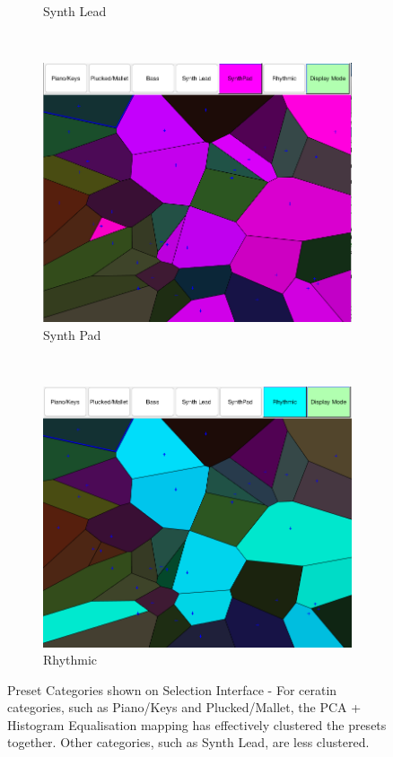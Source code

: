 \documentclass[11pt, oneside]{report}   	%
\begin{document}
\begin{figure}
\begin{subfigure}[b]{0.48\textwidth}
	\caption{Synth Lead}
	\label{fig:categoriesSynthLead}
\end{subfigure}
\\
\begin{subfigure}[b]{0.48\textwidth}
	\includegraphics[trim={0 0 0.01cm 0}, clip, width=\textwidth]{CategorySynthPad.png}
	\caption{Synth Pad}
	\label{fig:categoriesSynthPad}
\end{subfigure}
~ %
\begin{subfigure}[b]{0.48\textwidth}
	\includegraphics[width=\textwidth]{CategoryRhythmic.png}
	\caption{Rhythmic}
	\label{fig:categoriesRhythmic}
\end{subfigure}
	\caption{Preset Categories shown on Selection Interface - For ceratin categories, such as Piano/Keys and Plucked/Mallet, the PCA + Histogram Equalisation mapping has effectively clustered the presets together. Other categories, such as Synth Lead, are less clustered.}
	\label{fig:Categories}
\end{figure}
\end{document}
